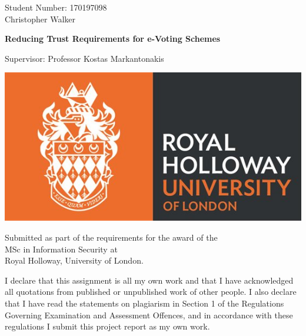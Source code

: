 \documentclass[oneside]{scrbook}
\begin{document}
\begin{titlepage}



\begin{center}
    {\large Student Number: 170197098 \\ Christopher Walker}

    \vspace*{1cm}

    {\Huge\bfseries Reducing Trust Requirements for e-Voting Schemes}

    \vspace*{1cm}

    {\large Supervisor:  Professor Kostas Markantonakis}

    \vspace*{1cm}

    \includegraphics[scale=0.5]{lib/rhuol_logo.jpg}

    \vspace*{2cm}

    \large Submitted as part of the requirements for the award of the \\
MSc in Information Security at \\
Royal Holloway, University of London.

\end{center}

\vspace*{3cm}

\begin{flushleft}
I declare that this assignment is all my own work and that I have acknowledged all quotations from published or unpublished work of other people.  I also declare that I have read the statements on plagiarism in Section 1 of the Regulations Governing Examination and Assessment Offences, and in accordance with these regulations I submit this project report as my own work.


\end{flushleft}
\end{titlepage}
\end{document}
